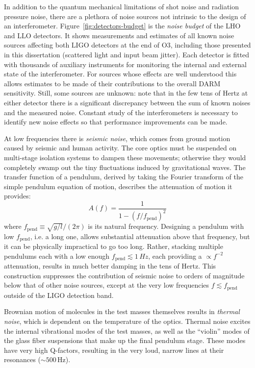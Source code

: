 In addition to the quantum mechanical limitations of shot noise and radiation pressure noise, there are a plethora of noise sources not intrinsic to the design of an interferometer.
Figure~\ref{fig:detectors-budget} is the \textit{noise budget} of the LHO and LLO detectors.
It shows measurements and estimates of all known noise sources affecting both LIGO detectors at the end of \ac{O3}, including those presented in this dissertation (scattered light and input beam jitter).
Each detector is fitted with thousands of auxiliary instruments for monitoring the internal and external state of the interferometer.
For sources whose effects are well understood this allows estimates to be made of their contributions to the overall \ac{DARM} sensitivity.
Still, some sources are unknown: note that in the few tens of Hertz at either detector there is a significant discrepancy between the sum of known noises and the measured noise.
Constant study of the interferometers is necessary to identify new noise effects so that performance improvements can be made.

At low frequencies there is \textit{seismic noise}, which comes from ground motion caused by seismic and human activity.
The core optics must be suspended on multi-stage isolation systems to dampen these movements; otherwise they would completely swamp out the tiny fluctuations induced by gravitational waves.
The transfer function of a pendulum, derived by taking the Fourier transform of the simple pendulum equation of motion, describes the attenuation of motion it provides:
\begin{equation}
  A(f) = \frac{1}{1 - (f / f_{\mathrm{pend}})^2}
\end{equation}
where $f_{\mathrm{pend}} \equiv \sqrt{g/l} / (2\pi)$ is its natural frequency.
Designing a pendulum with low $f_{\mathrm{pend}}$, i.e. a long one, allows substantial attenuation above that frequency, but it can be physically impractical to go too long.
Rather, stacking multiple pendulums each with a low enough $f_{\mathrm{pend}} \lesssim 1\,Hz$, each providing a $\propto f^{-2}$ attenuation, results in much better damping in the tens of Hertz.
This construction suppresses the contribution of seismic noise to orders of magnitude below that of other noise sources, except at the very low frequencies $f \lesssim f_{\mathrm{pend}}$ outside of the LIGO detection band.

Brownian motion of molecules in the test masses themselves results in \textit{thermal noise}, which is dependent on the temperature of the optics.
Thermal noise excites the internal vibrational modes of the test masses, as well as the ``violin'' modes of the glass fiber suspensions that make up the final pendulum stage.
These modes have very high Q-factors, resulting in the very loud, narrow lines at their resonances ($\sim 500$\,Hz).

